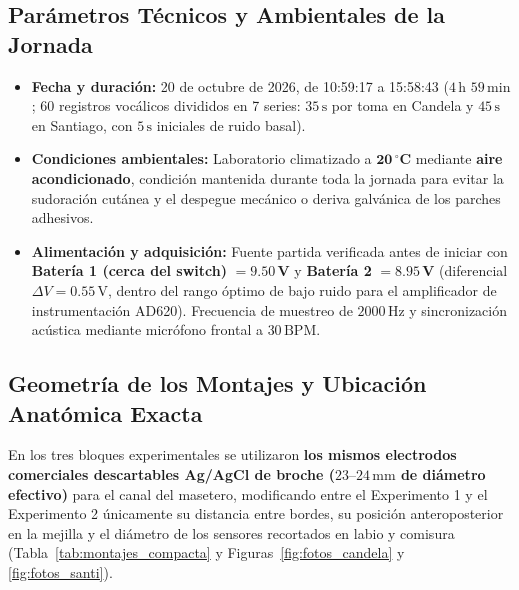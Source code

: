 \documentclass[11pt, a4paper]{article}
\begin{document}
\subsection{Parámetros Técnicos y Ambientales de la Jornada}
\begin{itemize}\setlength{\itemsep}{1pt}
    \item \textbf{Fecha y duración:} 20 de octubre de 2026, de 10:59:17 a 15:58:43 ($4\,\text{h }59\,\text{min}$; 60 registros vocálicos divididos en 7 series: $35\,\text{s}$ por toma en Candela y $45\,\text{s}$ en Santiago, con $5\,\text{s}$ iniciales de ruido basal).
    \item \textbf{Condiciones ambientales:} Laboratorio climatizado a $\mathbf{20\,^\circ\text{C}}$ mediante \textbf{aire acondicionado}, condición mantenida durante toda la jornada para evitar la sudoración cutánea y el despegue mecánico o deriva galvánica de los parches adhesivos.
    \item \textbf{Alimentación y adquisición:} Fuente partida verificada antes de iniciar con \textbf{Batería 1 (cerca del switch)} $= \mathbf{9.50\,\text{V}}$ y \textbf{Batería 2} $= \mathbf{8.95\,\text{V}}$ (diferencial $\Delta V = 0.55\,\text{V}$, dentro del rango óptimo de bajo ruido para el amplificador de instrumentación AD620). Frecuencia de muestreo de $2000\,\text{Hz}$ y sincronización acústica mediante micrófono frontal a $30\,\text{BPM}$.
\end{itemize}

\subsection{Geometría de los Montajes y Ubicación Anatómica Exacta}
En los tres bloques experimentales se utilizaron \textbf{los mismos electrodos comerciales descartables Ag/AgCl de broche ($23\text{--}24\,\text{mm}$ de diámetro efectivo)} para el canal del masetero, modificando entre el Experimento 1 y el Experimento 2 únicamente su distancia entre bordes, su posición anteroposterior en la mejilla y el diámetro de los sensores recortados en labio y comisura (Tabla~\ref{tab:montajes_compacta} y Figuras~\ref{fig:fotos_candela} y \ref{fig:fotos_santi}).
\end{document}
